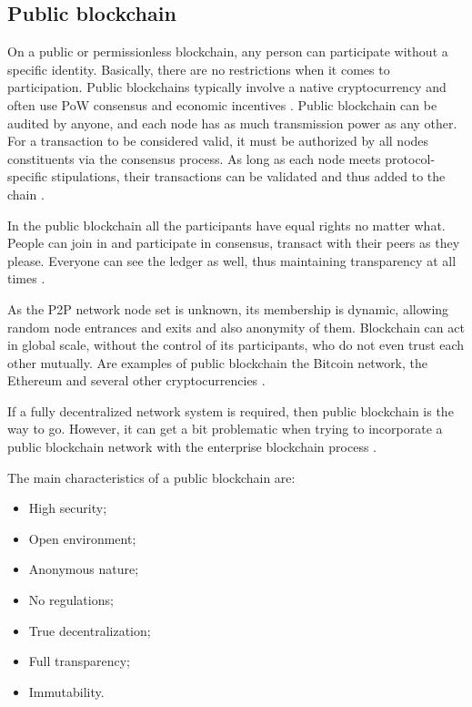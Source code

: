 \subsection{Public blockchain}\label{sec:blockchainPublica}
On a public or permissionless blockchain, any person can participate without a specific identity. Basically, there are no restrictions when it comes to participation. Public blockchains typically involve a native cryptocurrency and often use \acf{PoW} consensus and economic incentives \cite{androulaki2018hyperledger}. Public blockchain can be audited by anyone, and each node has as much transmission power as any other. For a transaction to be considered valid, it must be authorized by all nodes constituents via the consensus process. As long as each node meets protocol-specific stipulations, their transactions can be validated and thus added to the chain \cite{Comstor2018}.

In the public blockchain all the participants have equal rights no matter what. People can join in and participate in consensus, transact with their peers as they please. Everyone can see the ledger as well, thus maintaining transparency at all times \cite{101blockchains}.

As the P2P network node set is unknown, its membership is dynamic, allowing random node entrances and exits and also anonymity of them. Blockchain can act in global scale, without the control of its participants, who do not even trust each other mutually. Are examples of public blockchain the Bitcoin network, the Ethereum and several other cryptocurrencies \cite{bashir2018mastering, antonopoulos2017mastering}.

If a fully decentralized network system is required, then public blockchain is the way to go. However, it can get a bit problematic when trying to incorporate a public blockchain network with the enterprise blockchain process \cite{101blockchains}.

The main characteristics of a public blockchain are:

\begin{itemize}
\item High security;
\item Open environment;
\item Anonymous nature;
\item No regulations;
\item True decentralization;
\item Full transparency;
\item Immutability.
\end{itemize}

